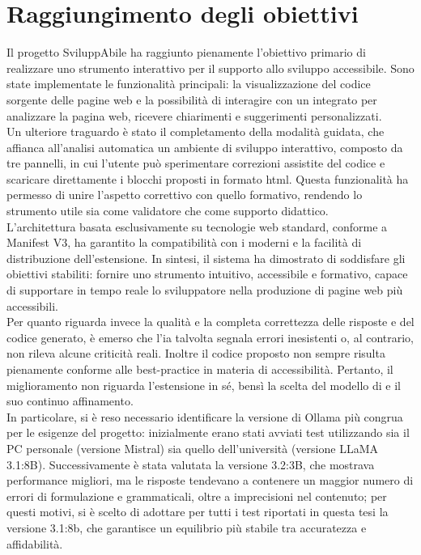 \section{Raggiungimento degli obiettivi}
\noindent Il progetto SviluppAbile ha raggiunto pienamente l’obiettivo primario di realizzare uno strumento interattivo per il supporto allo sviluppo accessibile. Sono state implementate le funzionalità principali: la visualizzazione del codice sorgente delle pagine web e la possibilità di interagire con un  integrato per analizzare la pagina web, ricevere chiarimenti e suggerimenti personalizzati.\\
Un ulteriore traguardo è stato il completamento della modalità guidata, che affianca all’analisi automatica un ambiente di sviluppo interattivo, composto da tre pannelli, in cui l’utente può sperimentare correzioni assistite del codice e scaricare direttamente i blocchi proposti in formato \acrshort{html}. Questa funzionalità ha permesso di unire l’aspetto correttivo con quello formativo, rendendo lo strumento utile sia come validatore che come supporto didattico.\\
L’architettura basata esclusivamente su tecnologie web standard, conforme a Manifest V3, ha garantito la compatibilità con i  moderni e la facilità di distribuzione dell’estensione. 
In sintesi, il sistema ha dimostrato di soddisfare gli obiettivi stabiliti: fornire uno strumento intuitivo, accessibile e formativo, capace di supportare in tempo reale lo sviluppatore nella produzione di pagine web più accessibili.\\
Per quanto riguarda invece la qualità e la completa correttezza delle risposte e del codice generato, è emerso che l’\acrshort{ia} talvolta segnala errori inesistenti o, al contrario, non rileva alcune criticità reali. Inoltre il codice proposto non sempre risulta pienamente conforme alle best-practice in materia di accessibilità. Pertanto, il miglioramento non riguarda l’estensione in sé, bensì la scelta del modello di  e il suo continuo affinamento.\\
In particolare, si è reso necessario identificare la versione di Ollama più congrua per le esigenze del progetto: inizialmente erano stati avviati test utilizzando sia il PC personale (versione Mistral) sia quello dell’università (versione LLaMA 3.1:8B). Successivamente è stata valutata la versione 3.2:3B, che mostrava performance migliori, ma le risposte tendevano a contenere un maggior numero di errori di formulazione e grammaticali, oltre a imprecisioni nel contenuto; per questi motivi, si è scelto di adottare per tutti i test riportati in questa tesi la versione 3.1:8b, che garantisce un equilibrio più stabile tra accuratezza e affidabilità.

